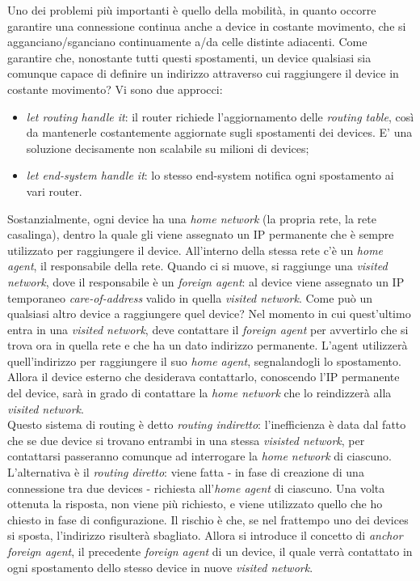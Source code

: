 Uno dei problemi più importanti è quello della mobilità, in quanto occorre garantire una connessione continua anche a device in costante movimento, che si agganciano/sganciano continuamente a/da celle distinte adiacenti. Come garantire che, nonostante tutti questi spostamenti, un device qualsiasi sia comunque capace di definire un indirizzo attraverso cui raggiungere il device in costante movimento? Vi sono due approcci:
\begin{itemize}
	\item \textit{let routing handle it}: il router richiede l'aggiornamento delle \textit{routing table}, così da mantenerle costantemente aggiornate sugli spostamenti dei devices. E' una soluzione decisamente non scalabile su milioni di devices;
	\item \textit{let end-system handle it}: lo stesso end-system notifica ogni spostamento ai vari router.
\end{itemize}
Sostanzialmente, ogni device ha una \textit{home network} (la propria rete, la rete casalinga), dentro la quale gli viene assegnato un IP permanente che è sempre utilizzato per raggiungere il device. All'interno della stessa rete c'è un \textit{home agent}, il responsabile della rete. Quando ci si muove, si raggiunge una \textit{visited network}, dove il responsabile è un \textit{foreign agent}: al device viene assegnato un IP temporaneo \textit{care-of-address} valido in quella \textit{visited network}. Come può un qualsiasi altro device a raggiungere quel device? Nel momento in cui quest'ultimo entra in una \textit{visited network}, deve contattare il \textit{foreign agent} per avvertirlo che si trova ora in quella rete e che ha un dato indirizzo permanente. L'agent utilizzerà quell'indirizzo per raggiungere il suo \textit{home agent}, segnalandogli lo spostamento. Allora il device esterno che desiderava contattarlo, conoscendo l'IP permanente del device, sarà in grado di contattare la \textit{home network} che lo reindizzerà alla \textit{visited network}. \\
Questo sistema di routing è detto \textit{routing indiretto}: l'inefficienza è data dal fatto che se due device si trovano entrambi in una stessa \textit{visisted network}, per contattarsi passeranno comunque ad interrogare la \textit{home network} di ciascuno. L'alternativa è il \textit{routing diretto}: viene fatta - in fase di creazione di una connessione tra due devices - richiesta all'\textit{home agent} di ciascuno. Una volta ottenuta la risposta, non viene più richiesto, e viene utilizzato quello che ho chiesto in fase di configurazione. Il rischio è che, se nel frattempo uno dei devices si sposta, l'indirizzo risulterà sbagliato. Allora si introduce il concetto di \textit{anchor foreign agent}, il precedente \textit{foreign agent} di un device, il quale verrà contattato in ogni spostamento dello stesso device in nuove \textit{visited network}.

